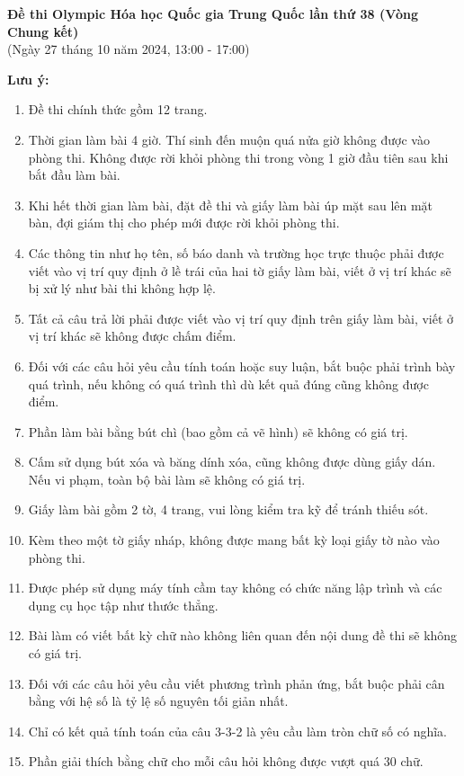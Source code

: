\begin{center}
    \Large\textbf{Đề thi Olympic Hóa học Quốc gia Trung Quốc lần thứ 38 (Vòng Chung kết)} \\
    \normalsize (Ngày 27 tháng 10 năm 2024, 13:00 - 17:00)
\end{center}

\textbf{Lưu ý:}
\begin{enumerate}
    \item Đề thi chính thức gồm 12 trang.
    \item Thời gian làm bài 4 giờ. Thí sinh đến muộn quá nửa giờ không được vào phòng thi. Không được rời khỏi phòng thi trong vòng 1 giờ đầu tiên sau khi bắt đầu làm bài.
    \item Khi hết thời gian làm bài, đặt đề thi và giấy làm bài úp mặt sau lên mặt bàn, đợi giám thị cho phép mới được rời khỏi phòng thi.
    \item Các thông tin như họ tên, số báo danh và trường học trực thuộc phải được viết vào vị trí quy định ở lề trái của hai tờ giấy làm bài, viết ở vị trí khác sẽ bị xử lý như bài thi không hợp lệ.
    \item Tất cả câu trả lời phải được viết vào vị trí quy định trên giấy làm bài, viết ở vị trí khác sẽ không được chấm điểm.
    \item Đối với các câu hỏi yêu cầu tính toán hoặc suy luận, bắt buộc phải trình bày quá trình, nếu không có quá trình thì dù kết quả đúng cũng không được điểm.
    \item Phần làm bài bằng bút chì (bao gồm cả vẽ hình) sẽ không có giá trị.
    \item Cấm sử dụng bút xóa và băng dính xóa, cũng không được dùng giấy dán. Nếu vi phạm, toàn bộ bài làm sẽ không có giá trị.
    \item Giấy làm bài gồm 2 tờ, 4 trang, vui lòng kiểm tra kỹ để tránh thiếu sót.
    \item Kèm theo một tờ giấy nháp, không được mang bất kỳ loại giấy tờ nào vào phòng thi.
    \item Được phép sử dụng máy tính cầm tay không có chức năng lập trình và các dụng cụ học tập như thước thẳng.
    \item Bài làm có viết bất kỳ chữ nào không liên quan đến nội dung đề thi sẽ không có giá trị.
    \item Đối với các câu hỏi yêu cầu viết phương trình phản ứng, bắt buộc phải cân bằng với hệ số là tỷ lệ số nguyên tối giản nhất.
    \item Chỉ có kết quả tính toán của câu 3-3-2 là yêu cầu làm tròn chữ số có nghĩa.
    \item Phần giải thích bằng chữ cho mỗi câu hỏi không được vượt quá 30 chữ.
\end{enumerate}

